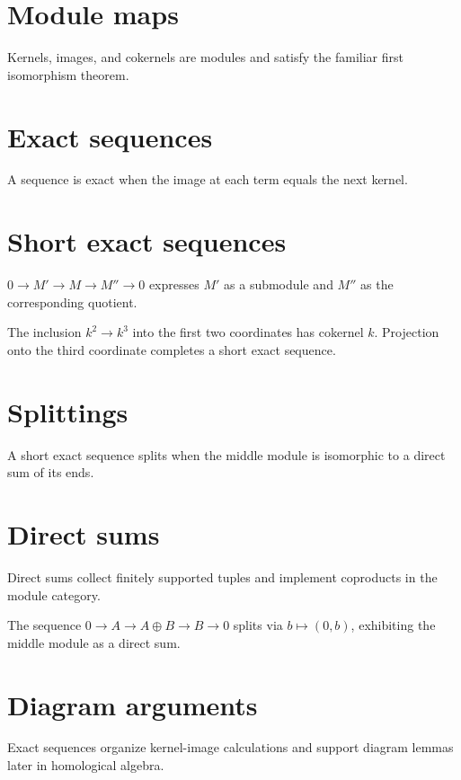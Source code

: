 \section{Module maps}
Kernels, images, and cokernels are modules and satisfy the familiar first isomorphism theorem.

\section{Exact sequences}
A sequence is exact when the image at each term equals the next kernel.

\section{Short exact sequences}
$0\to M'\to M\to M''\to0$ expresses $M'$ as a submodule and $M''$ as the corresponding quotient.

\begin{example}\label{ex:v09-expand-02}
The inclusion $k^2\to k^3$ into the first two coordinates has cokernel $k$. Projection onto the third coordinate completes a short exact sequence.
\end{example}
\section{Splittings}
A short exact sequence splits when the middle module is isomorphic to a direct sum of its ends.

\section{Direct sums}
Direct sums collect finitely supported tuples and implement coproducts in the module category.

\begin{example}\label{ex:v09-expand-03}
The sequence $0\to A\to A\oplus B\to B\to0$ splits via $b\mapsto(0,b)$, exhibiting the middle module as a direct sum.
\end{example}
\section{Diagram arguments}
Exact sequences organize kernel-image calculations and support diagram lemmas later in homological algebra.

